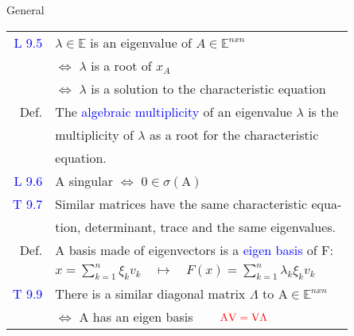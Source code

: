 \begin{mainbox}{General}
\begin{tabular}{rl}
	\rule{0pt}{3ex}
	\textcolor{blue}{L 9.5} & $\lambda\in\mathbb{E}$ is an eigenvalue of $A\in\mathbb{E}^{nxn}$\\
	& $\Leftrightarrow$ $\lambda$ is a root of $x_A$\\
	& $\Leftrightarrow$ $\lambda$ is a solution to the characteristic equation\\
	\rule{0pt}{3ex}
	Def. & The \textcolor{blue}{algebraic multiplicity} of an eigenvalue $\lambda$ is the\\
	& multiplicity of $\lambda$ as a root for the characteristic\\
	& equation.\\
	\rule{0pt}{3ex}
	\textcolor{blue}{L 9.6} & A singular $\Leftrightarrow$ $0\in\sigma(\text{A})$\\
	\rule{0pt}{3ex}
	\textcolor{blue}{T 9.7} & Similar matrices have the same characteristic equa-\\
	& tion, determinant, trace and the same eigenvalues.\\
	\rule{0pt}{3ex}
	Def. & A basis made of eigenvectors is a \textcolor{blue}{eigen basis} of F:\\
	& $x = \displaystyle\sum_{k=1}^n \xi_kv_k\quad\mapsto\quad F(x) = \displaystyle\sum_{k=1}^n \lambda_k\xi_kv_k$\\
	\rule{0pt}{3ex}
	\textcolor{blue}{T 9.9} & There is a similar diagonal matrix $\Lambda$ to $\text{A}\in\mathbb{E}^{nxn}$\\
	& $\Leftrightarrow$ A has an eigen basis $\qquad\textcolor{red}{\text{A}\text{V} = \text{V}\Lambda}$\\
\end{tabular}
\end{mainbox}


